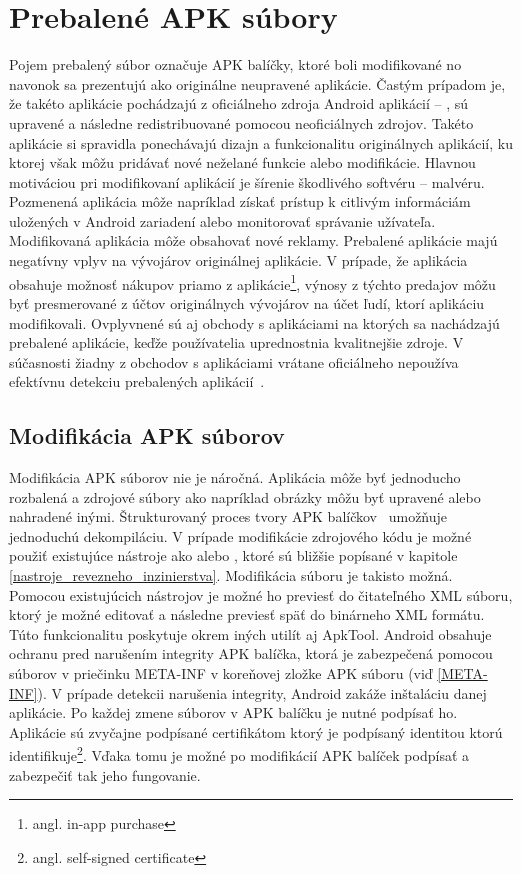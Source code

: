  \chapter{Prebalené APK súbory}
\label{Repackaged}
Pojem prebalený súbor označuje APK balíčky, ktoré boli modifikované no navonok sa prezentujú ako originálne neupravené aplikácie. Častým prípadom je, že takéto aplikácie pochádzajú z oficiálneho zdroja Android aplikácií -- , sú upravené a následne redistribuované pomocou neoficiálnych zdrojov. Takéto aplikácie si spravidla ponechávajú dizajn a funkcionalitu originálnych aplikácií, ku ktorej však môžu pridávať nové neželané funkcie alebo modifikácie. Hlavnou motiváciou pri modifikovaní aplikácií je šírenie škodlivého softvéru – malvéru. Pozmenená aplikácia môže napríklad získať prístup k citlivým informáciám uložených v Android zariadení alebo monitorovať správanie užívateľa. Modifikovaná aplikácia môže obsahovať nové reklamy. Prebalené aplikácie majú negatívny vplyv na vývojárov originálnej aplikácie. V prípade, že aplikácia obsahuje možnosť nákupov priamo z aplikácie\footnote{angl. in-app purchase}, výnosy z týchto predajov môžu byť presmerované z účtov originálnych vývojárov na účet ľudí, ktorí aplikáciu modifikovali. Ovplyvnené sú aj obchody s aplikáciami na ktorých sa nachádzajú prebalené aplikácie, keďže používatelia uprednostnia kvalitnejšie zdroje. V súčasnosti žiadny z obchodov s aplikáciami vrátane oficiálneho  nepoužíva efektívnu detekciu prebalených aplikácií~\cite{Zhauniarovich2014}. 

\section{Modifikácia APK súborov}
Modifikácia APK súborov nie je náročná. Aplikácia môže byť jednoducho rozbalená a zdrojové súbory ako napríklad obrázky môžu byť upravené alebo nahradené inými. Štrukturovaný proces tvory APK balíčkov~\cite{buildingAndRunning} umožňuje jednoduchú dekompiláciu. V prípade modifikácie zdrojového kódu je možné použiť existujúce nástroje ako  alebo , ktoré sú bližšie popísané v kapitole \ref{nastroje_revezneho_inzinierstva}. Modifikácia súboru  je takisto možná. Pomocou existujúcich nástrojov je možné ho previesť do čitateľného XML súboru, ktorý je možné editovať a následne previesť späť do binárneho XML formátu. Túto funkcionalitu poskytuje okrem iných utilít aj ApkTool.
Android obsahuje ochranu pred narušením integrity APK balíčka, ktorá je zabezpečená pomocou súborov v priečinku META-INF v koreňovej zložke APK súboru (viď \ref{META-INF}). V prípade detekcii narušenia integrity, Android zakáže inštaláciu danej aplikácie. Po každej zmene súborov v APK balíčku je nutné podpísať ho. Aplikácie sú zvyčajne podpísané certifikátom ktorý je podpísaný identitou ktorú identifikuje\footnote{angl. self-signed certificate}. Vďaka tomu je možné po modifikácií APK balíček podpísať a zabezpečiť tak jeho fungovanie.

